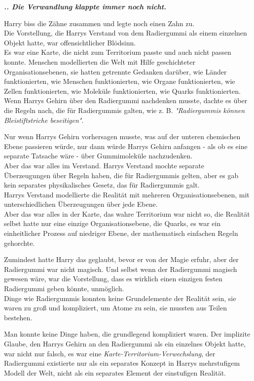 {\textbf{\emph{.. Die Verwandlung klappte immer noch nicht.}}

Harry biss die Zähne zusammen und legte noch einen Zahn zu.\\ Die Vorstellung, die Harrys Verstand von dem Radiergummi als einem einzelnen Objekt hatte, war offensichtlicher Blödsinn.\\ Es war eine Karte, die nicht zum Territorium passte und auch nicht passen konnte. Menschen modellierten die Welt mit Hilfe geschichteter Organisationsebenen, sie hatten getrennte Gedanken darüber, wie Länder funktionierten, wie Menschen funktionierten, wie Organe funktionierten, wie Zellen funktionierten, wie Moleküle funktionierten, wie Quarks funktionierten.\\ Wenn Harrys Gehirn über den Radiergummi nachdenken musste, dachte es über die Regeln nach, die für Radiergummis galten, wie z. B. \emph{"Radiergummis können Bleistiftstriche beseitigen"}.

Nur wenn Harrys Gehirn vorhersagen musste, was auf der unteren chemischen Ebene passieren würde, nur dann würde Harrys Gehirn anfangen - als ob es eine separate Tatsache wäre - über Gummimoleküle nachzudenken.\\ Aber das war alles im Verstand. Harrys Verstand mochte separate Überzeugungen über Regeln haben, die für Radiergummis gelten, aber es gab kein separates physikalisches Gesetz, das für Radiergummis galt.\\ Harrys Verstand modellierte die Realität mit mehreren Organisationsebenen, mit unterschiedlichen Überzeugungen über jede Ebene.\\ Aber das war alles in der Karte, das wahre Territorium war nicht so, die Realität selbst hatte nur eine einzige Organisationsebene, die Quarks, es war ein einheitlicher Prozess auf niedriger Ebene, der mathematisch einfachen Regeln gehorchte.

Zumindest hatte Harry das geglaubt, bevor er von der Magie erfuhr, aber der Radiergummi war nicht magisch. Und selbst wenn der Radiergummi magisch gewesen wäre, war die Vorstellung, dass es wirklich einen einzigen festen Radiergummi geben könnte, unmöglich.\\ Dinge wie Radiergummis konnten keine Grundelemente der Realität sein, sie waren zu groß und kompliziert, um Atome zu sein, sie mussten aus Teilen bestehen.

Man konnte keine Dinge haben, die grundlegend kompliziert waren. Der implizite Glaube, den Harrys Gehirn an den Radiergummi als ein einzelnes Objekt hatte, war nicht nur falsch, es war eine \emph{Karte-Territorium-Verwechslung}, der Radiergummi existierte nur als ein separates Konzept in Harrys mehrstufigem Modell der Welt, nicht als ein separates Element der einstufigen Realität.

}
